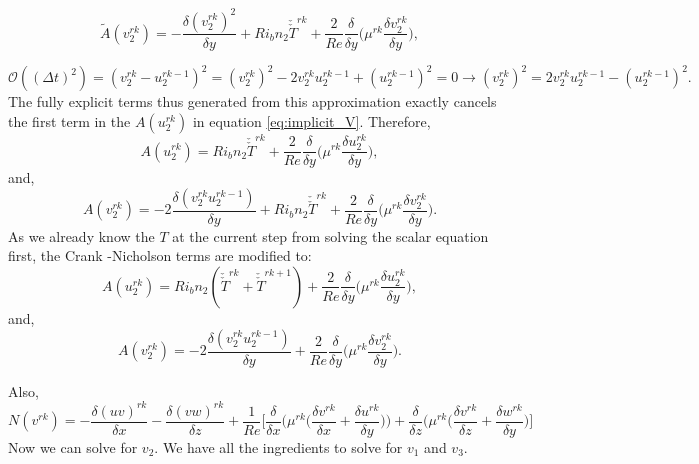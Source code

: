 \documentclass[preprint,12pt]{article}
\begin{document}
\begin{equation}
\tilde{A}(v_2^{rk})=-\frac{\delta ({v_2^{rk}})^2}{\delta y}+Ri_b n_2\check{\check{T}}^{rk}+\frac{2}{Re}\frac{\delta}{\delta y}\Big(\mu^{rk}\frac{\delta v_2^{rk}}{\delta y}\Big),
\end{equation}

\begin{equation}
\mathcal{O}((\Delta t)^2)=(v_2^{rk}-u_2^{rk-1})^2=(v_2^{rk})^2-2v_2^{rk}u_2^{rk-1}+(u_2^{rk-1})^2=0\rightarrow (v_2^{rk})^2=2v_2^{rk}u_2^{rk-1}-(u_2^{rk-1})^2.
\end{equation}
The fully explicit terms thus generated from this approximation exactly cancels the first term in the $A(u_2^{rk})$ in equation \eqref{eq:implicit_V}.
Therefore,
\begin{equation}
A(u_2^{rk})=Ri_b n_2\check{\check{T}}^{rk}+\frac{2}{Re}\frac{\delta}{\delta y}\Big(\mu^{rk}\frac{\delta u_2^{rk}}{\delta y}\Big),
\end{equation}
and,
\begin{equation}
{A}(v_2^{rk})=-2\frac{\delta ({v_2^{rk}}u_2^{rk-1})}{\delta y}+Ri_b n_2\check{\check{T}}^{rk}+\frac{2}{Re}\frac{\delta}{\delta y}\Big(\mu^{rk}\frac{\delta v_2^{rk}}{\delta y}\Big).
\end{equation}
As we already know the $T$ at the current step from solving the scalar equation first, the Crank -Nicholson terms are modified to: 
\begin{equation}
A(u_2^{rk})=Ri_b n_2(\check{\check{T}}^{rk}+\check{\check{T}}^{rk+1})+\frac{2}{Re}\frac{\delta}{\delta y}\Big(\mu^{rk}\frac{\delta u_2^{rk}}{\delta y}\Big),
\end{equation}
and,
\begin{equation}
{A}(v_2^{rk})=-2\frac{\delta ({v_2^{rk}}u_2^{rk-1})}{\delta y}+\frac{2}{Re}\frac{\delta}{\delta y}\Big(\mu^{rk}\frac{\delta v_2^{rk}}{\delta y}\Big).
\end{equation}

Also,
\begin{equation}
N(v^{rk})=-\frac{\delta {(uv)}^{rk}}{\delta x}-\frac{\delta {(vw)}^{rk}}{\delta z}+\frac{1}{Re}\Bigg[\frac{\delta}{\delta x}\Big({{\mu^{rk}}}\Big(\frac{\delta v^{rk}}{\delta x}+\frac{\delta u^{rk}}{\delta y} \Big)\Big)+\frac{\delta }{\delta z}\Big({{\mu^{rk}}}\Big(\frac{\delta v^{rk}}{\delta z}+\frac{\delta w^{rk}}{\delta y} \Big)\Bigg] 
\end{equation}
Now we can solve for $v_2$.
We have all the ingredients to solve for $v_1$ and $v_3$.
\end{document}
